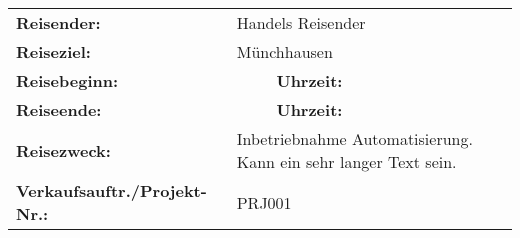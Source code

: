\documentclass[a4paper,10pt]{scrartcl}
\author{\TravName}
\date{\today}
\def \TravHeading   { Reisekostenabrechnung }
\def \TravName      { Handels Reisender } %
\def \TravTarget    { Münchhausen }       %
\def \TravStartedOn { \formatdate{01}{01}{2014} } %
\def \TravStartedAt { \formattime{08}{45}{00} }   %
\def \TravEndedOn   { \formatdate{05}{01}{2014} } %
\def \TravEndedAt   { \formattime{18}{15}{00} }   %
\def \TravReason    { Inbetriebnahme Automatisierung. Kann ein sehr langer Text sein. }
\def \TravProjNr    { PRJ001 }
\begin{document}


\begin{table}
	\begin{tabularx}{\textwidth}{lXlX}
	\textbf{Reisender:}                  & \multicolumn{3}{l}{ \TravName }                     \\
	\textbf{Reiseziel:}                  & \multicolumn{3}{l}{ \TravTarget }                   \\
	\textbf{Reisebeginn:}                & \TravStartedOn & \textbf{Uhrzeit:} & \TravStartedAt \\
	\textbf{Reiseende:}                  & \TravEndedOn   & \textbf{Uhrzeit:} & \TravEndedAt   \\
        \textbf{Reisezweck:}                 & \multicolumn{3}{l}{ \TravReason }                   \\
	\textbf{Verkaufsauftr./Projekt-Nr.:} & \multicolumn{3}{l}{ \TravProjNr }
	\end{tabularx}
\end{table}
\end{document}
